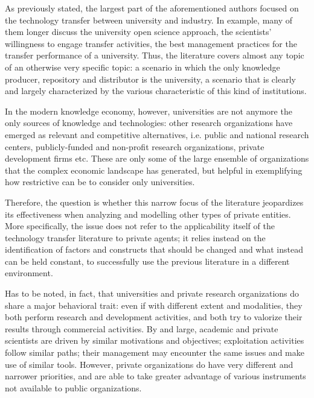 

\label{Chapter6}

As previously stated, the largest part of the aforementioned authors focused on the technology transfer between university and industry. In example, many of them longer discuss the university open science approach, the scientists' willingness to engage transfer activities, the best management practices for the transfer performance of a university. Thus, the literature covers almost any topic of an otherwise very specific topic: a scenario in which the only knowledge producer, repository and distributor is the university, a scenario that is clearly and largely characterized by the various characteristic of this kind of institutions.

In the modern knowledge economy, however, universities are not anymore the only sources of knowledge and technologies: other research organizations have emerged as relevant and competitive alternatives, i.e. public and national research centers, publicly-funded and non-profit research organizations, private development firms etc. These are only some of the large ensemble of organizations that the complex economic landscape has generated, but helpful in exemplifying how restrictive can be to consider only universities.

Therefore, the question is whether this narrow focus of the literature jeopardizes its effectiveness when analyzing and modelling other types of private entities. More specifically, the issue does not refer to the applicability itself of the technology transfer literature to private agents; it relies instead on the identification of factors and constructs that should be changed and what instead can be held constant, to successfully use the previous literature in a different environment.

Has to be noted, in fact, that universities and private research organizations do share a major behavioral trait: even if with different extent and modalities, they both perform research and development activities, and both try to valorize their results through commercial activities. By and large, academic and private scientists are driven by similar motivations and objectives; exploitation activities follow similar paths; their management may encounter the same issues and make use of similar tools. However, private organizations do have very different and narrower priorities, and are able to take greater advantage of various instruments not available to public organizations. 

